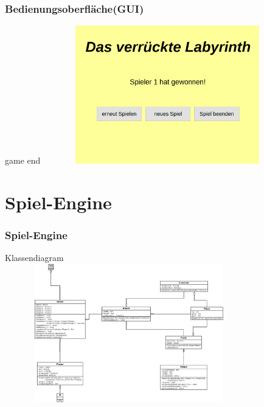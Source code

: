 \documentclass{beamer}
\begin{document}
	    \label{Frame7}	
		\begin{frame}
			\frametitle{Bedienungsoberfläche(GUI)}
			\begin{block}{game end}
				\includegraphics[width = 10.8cm, height = 6cm]{BilderGUI/07-end.png}
			\end{block}		
		\end{frame}
		
		\section{Spiel-Engine}
	    \label{Frame7}	
		\begin{frame}
			\frametitle{Spiel-Engine}
			\begin{block}{Klassendiagram}
				\includegraphics[width = 10.8cm, height = 6cm]{UML/umltest.jpeg}
			\end{block}		
		\end{frame}
\end{document}
